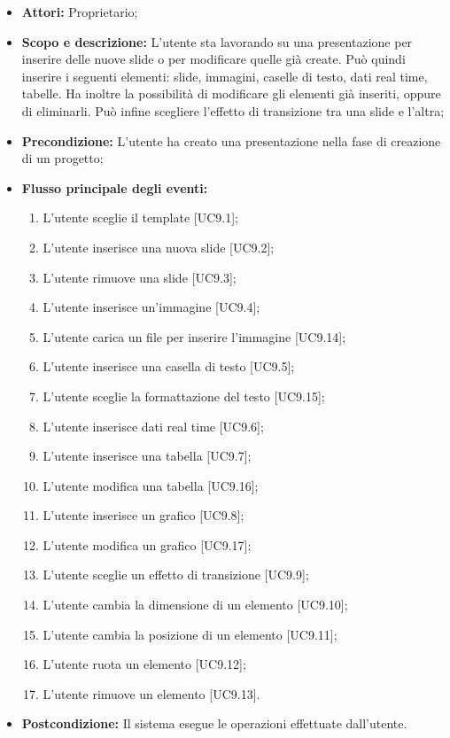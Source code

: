 \begin{itemize}
	\item \textbf{Attori:} Proprietario;
	\item \textbf{Scopo e descrizione:} L'utente sta lavorando su una presentazione per inserire delle nuove slide o per modificare quelle già create. Può quindi inserire i seguenti elementi: slide, immagini, caselle di testo, dati real time, tabelle. Ha inoltre la possibilità di modificare gli elementi già inseriti, oppure di eliminarli. Può infine scegliere l'effetto di transizione tra una slide e l'altra;
	\item \textbf{Precondizione:} L'utente ha creato una presentazione nella fase di creazione di un progetto;
	\item \textbf{Flusso principale degli eventi:}
	\begin{enumerate}
		
		\item L'utente sceglie il template [UC9.1];
		
		\item L'utente inserisce una nuova slide [UC9.2];
		\item L'utente rimuove una slide [UC9.3];
		
		\item L'utente inserisce un'immagine [UC9.4];
		\item L'utente carica un file per inserire l'immagine [UC9.14];
		
		\item L'utente inserisce una casella di testo [UC9.5];
		\item L'utente sceglie la formattazione del testo [UC9.15];
		
		\item L'utente inserisce dati real time [UC9.6];
		
		\item L'utente inserisce una tabella [UC9.7];
		\item L'utente modifica una tabella [UC9.16];
		
		\item L'utente inserisce un grafico [UC9.8];
		\item L'utente modifica un grafico [UC9.17];
		
		\item L'utente sceglie un effetto di transizione [UC9.9];
		
		\item L'utente cambia la dimensione di un elemento [UC9.10];
		
		\item L'utente cambia la posizione di un elemento [UC9.11];
		
		\item L'utente ruota un elemento [UC9.12];
		
		\item L'utente rimuove un elemento [UC9.13].
	\end{enumerate}
	\item \textbf{Postcondizione:} Il sistema esegue le operazioni effettuate dall'utente.
\end{itemize}


